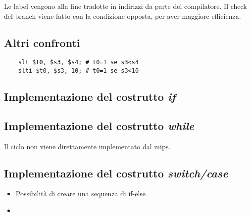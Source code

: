 \documentclass[class=book, crop=false]{standalone}
\begin{document}
Le label vengono alla fine tradotte in indirizzi da parte del compilatore.
Il check del branch viene fatto con la condizione opposta, per aver maggiore efficienza.

\subsection{Altri confronti}
\begin{verbatim}
	slt $t0, $s3, $s4; # t0=1 se s3<s4
	slti $t0, $s3, 10; # t0=1 se s3<10
\end{verbatim}


\subsection{Implementazione del costrutto \emph{if}}

\subsection{Implementazione del costrutto \emph{while}}
Il ciclo non viene direttamente implementato dal mips.\\

\subsection{Implementazione del costrutto \emph{switch/case}}
\begin{itemize}
	\item Possibilità di creare una sequenza di if-else
	\item
\end{itemize}
\end{document}
